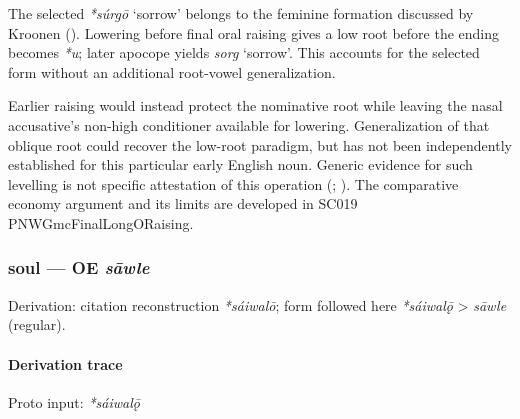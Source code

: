 \documentclass[
  british,
  a4paper,
]{article}
\providecommand{\Recon}[1]{\emph{*#1}}
\begin{document}
The selected \Recon{súrgō} `sorrow' belongs to the feminine formation
discussed by Kroonen ().
Lowering before final oral raising gives a low root before the ending
becomes \emph{*u}; later apocope yields \emph{sorg} `sorrow'. This
accounts for the selected form without an additional root-vowel
generalization.

Earlier raising would instead protect the nominative root while leaving
the nasal accusative's non-high conditioner available for lowering.
Generalization of that oblique root could recover the low-root paradigm,
but has not been independently established for this particular early
English noun. Generic evidence for such levelling is not specific
attestation of this operation (; ).
The comparative economy argument and its limits are developed in SC019
PNWGmcFinalLongORaising.

\subsubsection{\texorpdfstring{soul --- OE
\emph{sāwle}}{soul --- OE sāwle}}\label{soul-oe-sux101wle}

Derivation: citation reconstruction \emph{*sáiwalō}; form followed here
\emph{*sáiwalǭ} \textgreater{} \emph{sāwle} (regular).

\paragraph{Derivation trace}\label{derivation-trace-73}

Proto input: \emph{*sáiwalǭ}

\begingroup
\setlength{\fboxsep}{6pt}
\end{document}
